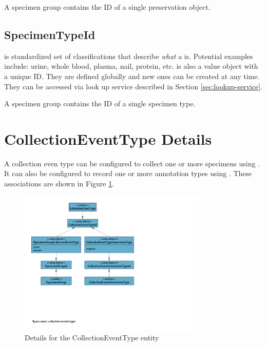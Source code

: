 A specimen group contains the ID of a single preservation object.

\subsection*{SpecimenTypeId}

 is standardized set of classifications that describe
\emph{what} a  is. Potential examples include: urine,
whole blood, plasma, nail, protein, etc.  is also a
value object with a unique ID. They are defined globally and new ones can be
created at any time. They can be accessed via look up service described in
Section \ref{sec:lookup-service}.

A specimen group contains the ID of a single specimen type.

\section{CollectionEventType Details}
\label{sec:collection-event-type}

A collection even type can be configured to collect one or more specimens using
. It can also be configured to
record one or more annotation types using
. These associations are shown in
Figure \ref{fig:collection-event-type}.

\begin{figure}[H]
  \centering
  \includegraphics[trim={9mm 70mm 96mm 9mm}, clip,
    width=0.8\textwidth]{images/collection-event-type}
  \caption{Details for the CollectionEventType entity}
  \label{fig:collection-event-type}
\end{figure}

